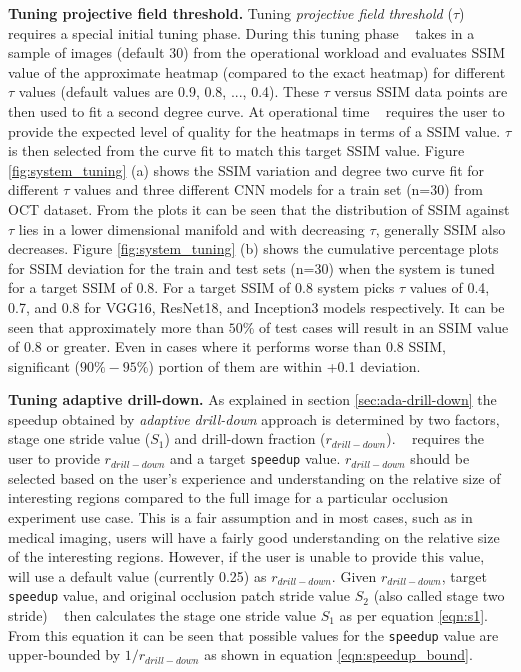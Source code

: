 \vspace{2mm}
\noindent \textbf{Tuning projective field threshold.}
Tuning \textit{projective field threshold} ($\tau$) requires a special initial tuning phase.
During this tuning phase \system~ takes in a sample of images (default 30) from the operational workload and evaluates SSIM value of the approximate heatmap (compared to the exact heatmap) for different $\tau$ values (default values are 0.9, 0.8, ..., 0.4).
These $\tau$ versus SSIM data points are then used to fit a second degree curve.
At operational time \system~ requires the user to provide the expected level of quality for the heatmaps in terms of a SSIM value. $\tau$ is then selected from the curve fit to match this target SSIM value.
Figure \ref{fig:system_tuning} (a) shows the SSIM variation and degree two curve fit for different $\tau$ values and three different CNN models for a train set (n=30) from OCT dataset.
From the plots it can be seen that the distribution of SSIM against $\tau$ lies in a lower dimensional manifold and with decreasing $\tau$, generally SSIM also decreases.
Figure \ref{fig:system_tuning} (b) shows the cumulative percentage plots for SSIM deviation for the train and test sets (n=30) when the system is tuned for a target SSIM of 0.8.
For a target SSIM of 0.8 system picks $\tau$ values of 0.4, 0.7, and 0.8 for VGG16, ResNet18, and Inception3 models respectively.
It can be seen that approximately more than $50\%$ of test cases will result in an SSIM value of 0.8 or greater.
Even in cases where it performs worse than 0.8 SSIM, significant ($90\%-95\%$) portion of them are within +0.1 deviation.

\vspace{2mm}
\noindent \textbf{Tuning adaptive drill-down.}
As explained in section \ref{sec:ada-drill-down} the speedup obtained by \textit{adaptive drill-down} approach is determined by two factors, stage one stride value ($S_1$) and drill-down fraction ($r_{drill-down}$).
\system~ requires the user to provide $r_{drill-down}$ and a target \texttt{speedup} value.
$r_{drill-down}$ should be selected based on the user's experience and understanding on the relative size of interesting regions compared to the full image for a particular occlusion experiment use case.
This is a fair assumption and in most cases, such as in medical imaging, users will have a fairly good understanding on the relative size of the interesting regions.
However, if the user is unable to provide this value, \system~ will use a default value (currently 0.25) as $r_{drill-down}$.
Given $r_{drill-down}$, target \texttt{speedup} value, and original occlusion patch stride value $S_2$ (also called stage two stride) \system~ then calculates the stage one stride value $S_1$ as per equation \ref{eqn:s1}.
From this equation it can be seen that possible values for the \texttt{speedup} value are upper-bounded by $1/r_{drill-down}$ as shown in equation \ref{eqn:speedup_bound}.

